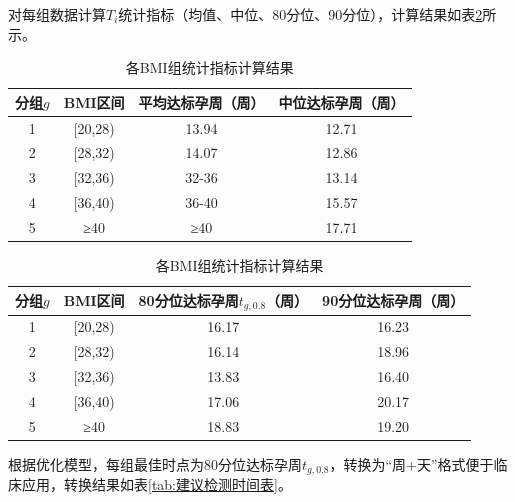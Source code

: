 \documentclass[withoutpreface,bwprint]{cumcmthesis} %
\begin{document}
对每组数据计算$T_i$统计指标（均值、中位、80分位、90分位），计算结果如表\ref{tab:各BMI组统计指标计算结果}所示。
\begin{table}[H]
    \centering  %
    \caption{各BMI组统计指标计算结果}  %
    \label{tab:各BMI组统计指标计算结果}  %
    \begin{threeparttable}
        \begin{tabularx}{0.9\textwidth}{c c c c }
            \toprule[1.5pt]
            \textbf{分组$g$} & \textbf{BMI区间} & \textbf{平均达标孕周（周）} & \textbf{中位达标孕周（周）} \\ 
            \midrule[1pt]
            1 & [20,28) & 13.94 & 12.71  \\  
            2 & [28,32) & 14.07 & 12.86  \\  
            3 & [32,36) & 32-36 & 13.14  \\  
            4 & [36,40) & 36-40 & 15.57  \\  
            5 & ≥40     & ≥40   & 17.71  \\  
            \bottomrule[1.5pt]
        \end{tabularx}
        \begin{tabularx}{0.9\textwidth}{c c c c }
            \textbf{分组$g$} & \textbf{BMI区间} & \textbf{80分位达标孕周$t_{g,0.8}$（周）} & \textbf{90分位达标孕周（周）}\\ 
            \midrule[1pt]
            1 & [20,28)  & 16.17 & 16.23 \\  
            2 & [28,32)  & 16.14 & 18.96 \\  
            3 & [32,36)  & 13.83 & 16.40 \\  
            4 & [36,40)  & 17.06 & 20.17 \\  
            5 & ≥40      & 18.83 & 19.20 \\  
            \bottomrule[1.5pt]
        \end{tabularx}
    \end{threeparttable}
\end{table}



根据优化模型，每组最佳时点为80分位达标孕周$t_{g,0.8}$，转换为“周+天”格式便于临床应用，转换结果如表\ref{tab:建议检测时间表}。
\end{document}
